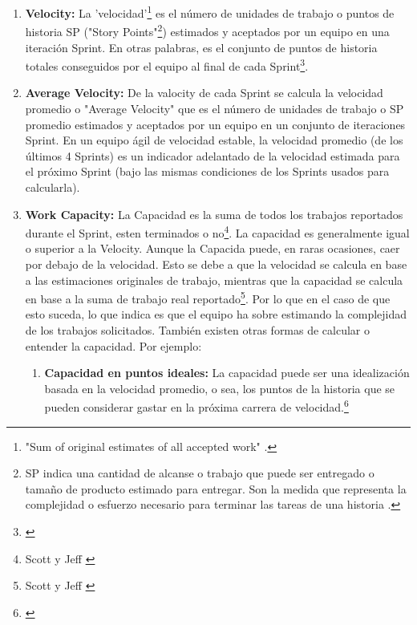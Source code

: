 \begin{enumerate}

\item {\textbf{Velocity:} La 'velocidad'\footnote{"Sum of original estimates of all accepted work" \cite{Scott-Jeff-2013}.} es el número de unidades de trabajo o puntos de historia SP ("Story Points"\footnote{SP indica una cantidad de alcanse o trabajo que puede ser entregado o tamaño de producto estimado para entregar. Son la medida que representa la complejidad o esfuerzo necesario para terminar las tareas de una historia \cite{Jipson-Thomas-2015}.}) estimados y aceptados por un equipo en una iteración Sprint. En otras palabras, es el conjunto de puntos de historia totales conseguidos por el equipo al final de cada Sprint\footnote{\cite{Jipson-Thomas-2015}}.}

\item {\textbf{Average Velocity:} De la valocity de cada Sprint se calcula la velocidad promedio o "Average Velocity" que es el número de unidades de trabajo o SP promedio estimados y aceptados por un equipo en un conjunto de iteraciones Sprint. En un equipo ágil de velocidad estable, la velocidad promedio (de los últimos 4 Sprints) es un indicador adelantado de la velocidad estimada para el próximo Sprint (bajo las mismas condiciones de los Sprints usados para calcularla).}

\item {\textbf{Work Capacity:} La Capacidad es la suma de todos los trabajos reportados durante el Sprint, esten terminados o no\footnote{Scott y Jeff \cite{Scott-Jeff-2013}}. La capacidad es generalmente igual o superior a la Velocity. Aunque la Capacida puede, en raras ocasiones, caer por debajo de la velocidad. Esto se debe a que la velocidad se calcula en base a las estimaciones originales de trabajo, mientras que la capacidad se calcula en base a la suma de trabajo real reportado\footnote{Scott y Jeff \cite{Scott-Jeff-2013}}. Por lo que en el caso de que esto suceda, lo que indica es que el equipo ha sobre estimando la complejidad de los trabajos solicitados. También existen otras formas de calcular o entender la capacidad. Por ejemplo:

  \begin{enumerate}
  \item {\textbf{Capacidad en puntos ideales:} La capacidad puede ser una idealización basada en la velocidad promedio, o sea, los puntos de la historia que se pueden considerar gastar en la próxima carrera de velocidad.\footnote{\cite{Satish-Thatte-2013}}}


\end{enumerate}}
\end{enumerate}
